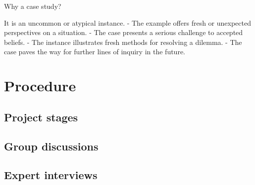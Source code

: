 Why a case study?

It is an uncommon or atypical instance.
- The example offers fresh or unexpected perspectives on a situation.
- The case presents a serious challenge to accepted beliefs.
- The instance illustrates fresh methods for resolving a dilemma.
- The case paves the way for further lines of inquiry in the future.


\section{Procedure}
\label{chapter3-procedure}

\subsection{Project stages}
\label{chapter3-project-stages}




\subsection{Group discussions}
\label{chapter3-group-discussions}

\subsection{Expert interviews}
\label{chapter3-expert-interviews}

